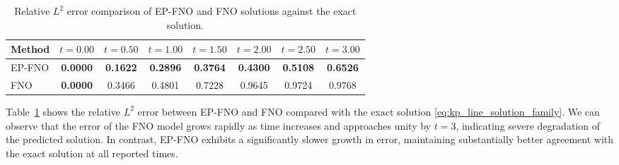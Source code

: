 \documentclass[11pt,a4paper]{article}
\theoremstyle{definition}
\theoremstyle{remark}
\numberwithin{equation}{section}
\numberwithin{figure}{section}
\numberwithin{table}{section}
\begin{document}
\begin{table}[H]
\centering
\caption{Relative $L^2$ error comparison of EP-FNO and FNO solutions against the exact solution.}
\label{tab:epfno_fno_kp_line_l2_error_comparison}
\renewcommand{\arraystretch}{1.15}
\begin{tabular}{lccccccc}
\toprule[1.5pt]
\textbf{Method} 
& \textbf{$t=0.00$} & \textbf{$t=0.50$} & \textbf{$t=1.00$} & \textbf{$t=1.50$} 
& \textbf{$t=2.00$} & \textbf{$t=2.50$} & \textbf{$t=3.00$} \\
\midrule[1.2pt]
EP-FNO 
& \textbf{0.0000} & \textbf{0.1622} & \textbf{0.2896} 
& \textbf{0.3764} & \textbf{0.4300} & \textbf{0.5108} 
& \textbf{0.6526} \\
FNO    
& \textbf{0.0000} & 0.3466 & 0.4801 
& 0.7228 & 0.9645 & 0.9724 
& 0.9768 \\
\bottomrule[1.5pt]
\end{tabular}
\end{table}


Table~\ref{tab:epfno_fno_kp_line_l2_error_comparison} shows the relative $L^2$ error between EP-FNO and FNO compared with the exact solution \eqref{eq:kp_line_solution_family}. We can observe that the error of the FNO model grows rapidly as time increases and approaches unity by $t=3$, indicating severe degradation of the predicted solution. In contrast, EP-FNO exhibits a significantly slower growth in error, maintaining substantially better agreement with the exact solution at all reported times. 

\end{document}
